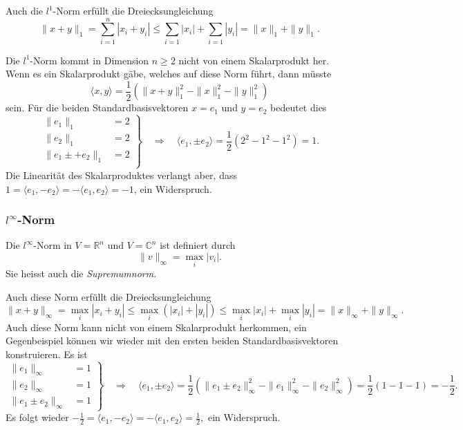 Auch die $l^1$-Norm erfüllt die Dreiecksungleichung
\[
\|x+y\|_1
=
\sum_{i=1}^n |x_i+y_i|
\le 
\sum_{i=1} |x_i| + \sum_{i=1} |y_i|
=
\|x\|_1 + \|y\|_1.
\]

Die $l^1$-Norm kommt in Dimension $n\ge 2$ nicht von einem Skalarprodukt her.
Wenn es ein Skalarprodukt gäbe, welches auf diese Norm führt, dann
müsste 
\[
\langle x,y\rangle
=
\frac12(\|x+y\|_1^2-\|x\|_1^2-\|y\|_1^2)
\]
sein.
Für die beiden Standardbasisvektoren $x=e_1$ und $y=e_2$ 
bedeutet dies
\[
\left .
\begin{aligned}
\|e_1\|_1 &= 2\\
\|e_2\|_1 &= 2\\
\|e_1\pm +e_2\|_1 &= 2\\
\end{aligned}
\right\}
\quad\Rightarrow\quad
\langle e_1,\pm e_2\rangle
=
\frac12( 2^2 - 1^2 - 1^2) 
=1.
\]
Die Linearität des Skalarproduktes verlangt aber, dass
$1=\langle e_1,-e_2\rangle = -\langle e_1,e_2\rangle = -1$,
ein Widerspruch.

\subsubsection{$l^\infty$-Norm}

\begin{definition}
Die $l^\infty$-Norm in $V=\mathbb{R}^n$ und $V=\mathbb{C}^n$ ist definiert
durch
\[
\|v\|_\infty
=
\max_{i} |v_i|.
\]
Sie heisst auch die {\em Supremumnorm}.
%
%
\end{definition}

Auch diese Norm  erfüllt die Dreiecksungleichung
\[
\|x+y\|_\infty
=
\max_i |x_i+y_i|
\le
\max_i (|x_i| + |y_i|)
\le
\max_i |x_i| + \max_i |y_i|
=
\|x\|_\infty + \|y\|_\infty.
\]
Auch diese Norm kann nicht von einem Skalarprodukt herkommen, ein
Gegenbeispiel können wir wieder mit den ersten beiden Standardbasisvektoren
konstruieren.
Es ist
\[
\left.
\begin{aligned}
\|e_1\|_\infty &= 1\\
\|e_2\|_\infty &= 1\\
\|e_1\pm e_2\|_\infty &= 1
\end{aligned}
\right\}
\quad\Rightarrow\quad
\langle e_1,\pm e_2\rangle
=
\frac12(\|e_1\pm e_2\|_\infty^2 - \|e_1\|_\infty^2 - \|e_2\|_\infty^2)
=
\frac12(1-1-1) = -\frac12.
\]
Es folgt wieder
\(
-\frac12
=
\langle e_1,-e_2\rangle
=
-\langle e_1,e_2\rangle
=
\frac12,
\)
ein Widerspruch.

